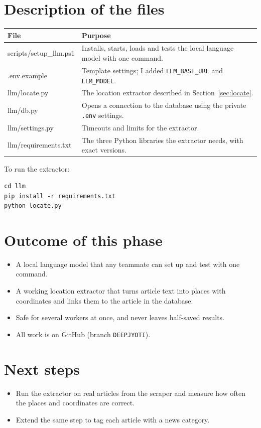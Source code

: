\documentclass[11pt,a4paper]{article}
\newcommand{\head}[1]{\textbf{#1}}
\newcommand{\code}[1]{\texttt{#1}}
\begin{document}
\section{Description of the files}

\begin{tabularx}{\textwidth}{>{\ttfamily}p{4.6cm} L}
\toprule
{} \head{\sffamily File} & \head{Purpose} \\
\midrule
scripts/setup\_llm.ps1 & Installs, starts, loads and tests the local language model with one command. \\
.env.example & Template settings; I added \code{LLM\_BASE\_URL} and \code{LLM\_MODEL}. \\
llm/locate.py & The location extractor described in Section~\ref{sec:locate}. \\
llm/db.py & Opens a connection to the database using the private \code{.env} settings. \\
llm/settings.py & Timeouts and limits for the extractor. \\
llm/requirements.txt & The three Python libraries the extractor needs, with exact versions. \\
\bottomrule
\end{tabularx}

To run the extractor:

\begin{lstlisting}
cd llm
pip install -r requirements.txt
python locate.py
\end{lstlisting}

\section{Outcome of this phase}

\begin{itemize}
  \item A local language model that any teammate can set up and test with one command.
  \item A working location extractor that turns article text into places with coordinates and links them to the article in the database.
  \item Safe for several workers at once, and never leaves half-saved results.
  \item All work is on GitHub (branch \code{DEEPJYOTI}).
\end{itemize}

\section{Next steps}

\begin{itemize}
  \item Run the extractor on real articles from the scraper and measure how often the places and coordinates are correct.
  \item Extend the same step to tag each article with a news category.
\end{itemize}
\end{document}
